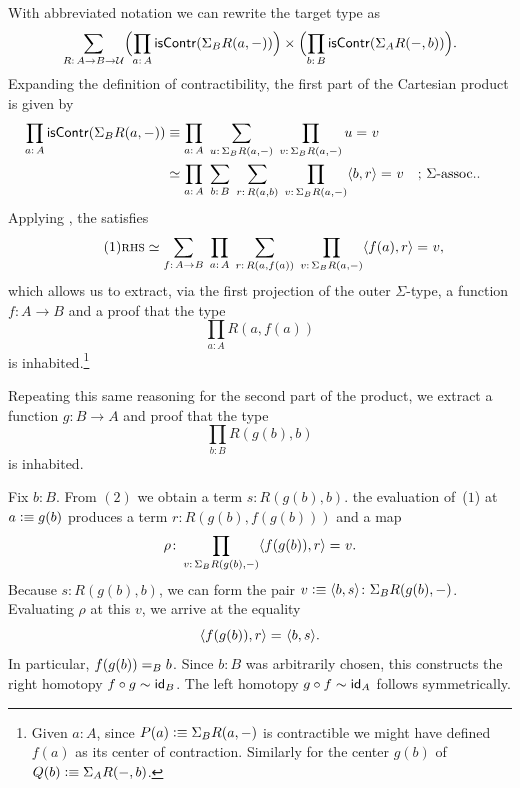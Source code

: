 \begin{solution}
    With abbreviated notation we can rewrite the target type as
    \[
        \sum_{R\colon A\to B\to\univ}
            \Bigl(
                \prod_{a\colon A}
                    \fun{isContr}(\Sigma_BR(a,\dummy))
            \Bigr)
            \times
            \Bigl(
                \prod_{b\colon B}
                    \fun{isContr}(\Sigma_AR(\dummy,b))
            \Bigr).
    \]
    Expanding the definition of contractibility, the first part of the Cartesian product is given by
    \begin{align*}
        \prod_{a\colon A}\fun{isContr}(\Sigma_BR(a,\dummy))
            &\equiv\prod_{a\colon A}\;
                \sum_{u\colon\Sigma_BR(a,\dummy)}\;
                \prod_{v\colon\Sigma_BR(a,\dummy)}u\eq{}v\\
            &\simeq\prod_{a\colon A}\;
                \sum_{b\colon B}\;
                \sum_{r\colon R(a,b)}\;
                \prod_{v\colon\Sigma_BR(a,\dummy)}
                    \dep{b,r}\eq{}v
                &&\text{; $\Sigma$-assoc.}.
    \end{align*}
    Applying , the \rhs satisfies
    \[\tag{$1$}
        \rhs
            \simeq\sum_{f\colon A\to B}\;
                \prod_{a\colon A}\;
                \sum_{r\colon R(a,f(a))}\;
                \prod_{v\colon\Sigma_BR(a,\dummy)}
                    \dep{f(a),r}\eq{}v,
    \]
    which allows us to extract, via the first projection of the outer $\Sigma$-type, a function $f\colon A\to B$ and a proof that the type
    \[
        \prod_{a\colon A}R(a,f(a))
    \]
    is inhabited.\footnote{Given $a\colon A$, since $P(a)\mathrel{\vcentcolon}\equiv\Sigma_BR(a,{\mathord-})$ is contractible we might have defined $f(a)$ as its center of contraction. Similarly for the center $g(b)$ of $Q(b)\mathrel{\vcentcolon}\equiv\Sigma_AR({\mathord-},b)$.}
    
    Repeating this same reasoning for the second part of the product, we extract a function $g\colon B\to A$ and proof that the type 
    \[\tag{$2$}
        \prod_{b\colon B}R(g(b),b)
    \]
    is inhabited.
    
    Fix $b\colon B$. From $(2)$ we obtain a term $s\colon R(g(b),b)$. the evaluation of~($1$) at $a\mathrel{\vcentcolon}\equiv g(b)$ produces a term $r\colon R(g(b),f(g(b)))$ and a map
    \[
        \rho\colon\prod_{v\colon\Sigma_BR(g(b),\dummy)}
            \dep{f(g(b)),r}\eq{} v.
    \]
    Because $s\colon R(g(b),b)$, we can form the pair $v\defeq\dep{b,s}\colon\Sigma_BR(g(b),\dummy)$. Evaluating $\rho$ at this $v$, we arrive at the equality
    \[
        \langle f(g(b)),r\rangle\mathrel{=_{}}\langle b,s\rangle.
    \]
    In particular, $f(g(b))\mathrel{=_{B}}b$. Since $b\colon B$ was arbitrarily chosen, this constructs the right homotopy $f\circ g\sim\mathsf{id}_B$. The left homotopy $g\circ f\sim\mathsf{id}_A$ follows symmetrically.


\end{solution}

